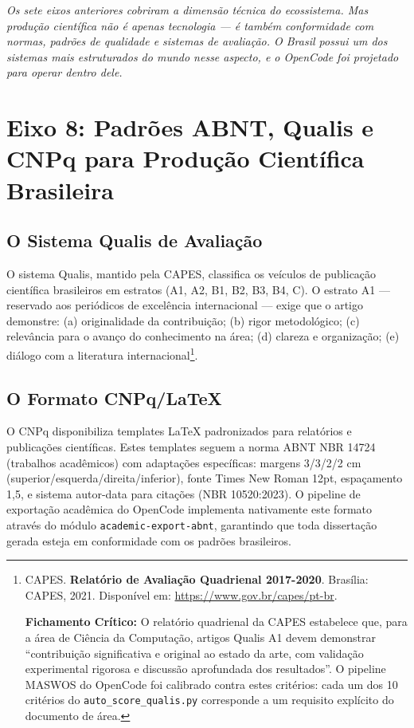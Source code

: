 {\small\itshape Os sete eixos anteriores cobriram a dimensão técnica do ecossistema. Mas produção científica não é apenas tecnologia — é também conformidade com normas, padrões de qualidade e sistemas de avaliação. O Brasil possui um dos sistemas mais estruturados do mundo nesse aspecto, e o OpenCode foi projetado para operar dentro dele.}

\section{Eixo 8: Padrões ABNT, Qualis e CNPq para Produção Científica Brasileira}

\subsection{O Sistema Qualis de Avaliação}

O sistema Qualis, mantido pela CAPES, classifica os veículos de publicação científica brasileiros em estratos (A1, A2, B1, B2, B3, B4, C). O estrato A1 --- reservado aos periódicos de excelência internacional --- exige que o artigo demonstre: (a) originalidade da contribuição; (b) rigor metodológico; (c) relevância para o avanço do conhecimento na área; (d) clareza e organização; (e) diálogo com a literatura internacional\footnote{
  CAPES. \textbf{Relatório de Avaliação Quadrienal 2017-2020}. Brasília: CAPES, 2021. Disponível em: \url{https://www.gov.br/capes/pt-br}.

  \textbf{Fichamento Crítico:} O relatório quadrienal da CAPES estabelece que, para a área de Ciência da Computação, artigos Qualis A1 devem demonstrar ``contribuição significativa e original ao estado da arte, com validação experimental rigorosa e discussão aprofundada dos resultados''. O pipeline MASWOS do OpenCode foi calibrado contra estes critérios: cada um dos 10 critérios do \texttt{auto\_score\_qualis.py} corresponde a um requisito explícito do documento de área.
}.

\subsection{O Formato CNPq/LaTeX}

O CNPq disponibiliza templates LaTeX padronizados para relatórios e publicações científicas. Estes templates seguem a norma ABNT NBR 14724 (trabalhos acadêmicos) com adaptações específicas: margens 3/3/2/2 cm (superior/esquerda/direita/inferior), fonte Times New Roman 12pt, espaçamento 1,5, e sistema autor-data para citações (NBR 10520:2023). O pipeline de exportação acadêmica do OpenCode implementa nativamente este formato através do módulo \texttt{academic-export-abnt}, garantindo que toda dissertação gerada esteja em conformidade com os padrões brasileiros.

